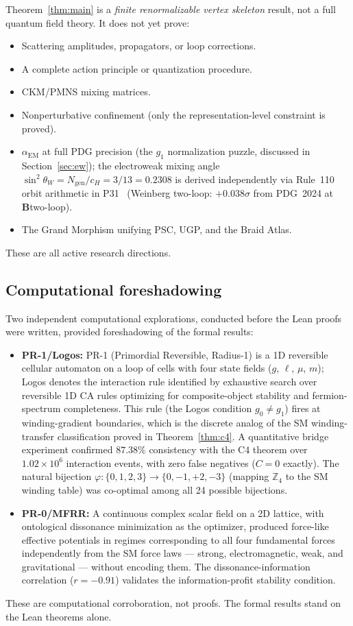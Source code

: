 \documentclass[12pt]{article}
\theoremstyle{remark}
\newcommand{\sinW}{\sin^2\!\theta_W}
\newcommand{\CatB}{\textbf{B}}
\begin{document}
Theorem~\ref{thm:main} is a \emph{finite renormalizable vertex skeleton} result,
not a full quantum field theory.  It does not yet prove:
\begin{itemize}
  \item Scattering amplitudes, propagators, or loop corrections.
  \item A complete action principle or quantization procedure.
  \item CKM/PMNS mixing matrices.
  \item Nonperturbative confinement (only the representation-level constraint is
    proved).
  \item $\alpha_\mathrm{EM}$ at full PDG precision (the $g_1$ normalization
    puzzle, discussed in Section~\ref{sec:ew}); the electroweak mixing
    angle $\sinW = N_{\mathrm{gen}}/c_H = 3/13 = 0.2308$ is derived
    independently via Rule~110 orbit arithmetic in
    P31~\cite{SpivackWeinbergAngle} (Weinberg two-loop: $+0.038\sigma$ from PDG~2024 at \CatB two-loop).
  \item The Grand Morphism unifying PSC, UGP, and the Braid Atlas.
\end{itemize}
These are all active research directions.

\subsection{Computational foreshadowing}

Two independent computational explorations, conducted before the Lean proofs
were written, provided foreshadowing of the formal results:
\begin{itemize}
  \item \textbf{PR-1/Logos:} PR-1 (Primordial Reversible, Radius-1) is a 1D
    reversible cellular automaton on a loop of cells with four state fields
    ($g$, $\ell$, $\mu$, $m$); Logos denotes the interaction rule identified
    by exhaustive search over reversible 1D CA rules optimizing for
    composite-object stability and fermion-spectrum completeness.  This rule (the Logos condition $g_0 \neq g_1$) fires at
    winding-gradient boundaries, which is the discrete analog of the SM
    winding-transfer classification proved in Theorem~\ref{thm:c4}.  A
    quantitative bridge experiment confirmed $87.38\%$ consistency with the
    C4 theorem over $1.02 \times 10^6$ interaction events, with zero false
    negatives ($C = 0$ exactly).  The natural bijection
    $\varphi : \{0,1,2,3\} \to \{0,-1,+2,-3\}$ (mapping $\mathbb{Z}_4$ to
    the SM winding table) was co-optimal among all 24 possible bijections.
  \item \textbf{PR-0/MFRR:} A continuous complex scalar field on a 2D lattice,
    with ontological dissonance minimization as the optimizer, produced force-like effective potentials in regimes corresponding to all four
    fundamental forces independently from the SM force laws --- strong,
    electromagnetic, weak, and gravitational --- without encoding them.  The
    dissonance-information correlation ($r = -0.91$) validates the
    information-profit stability condition.
\end{itemize}
These are computational corroboration, not proofs.  The formal results stand on
the Lean theorems alone.
\end{document}

